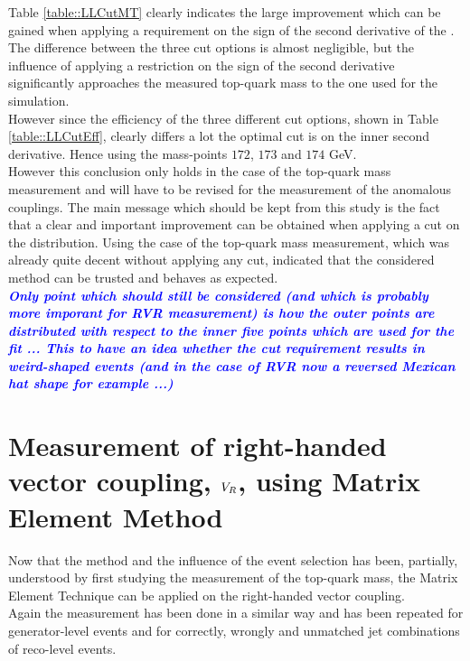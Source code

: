 Table \ref{table::LLCutMT} clearly indicates the large improvement which can be gained when applying a requirement on the sign of the second derivative of the \NegLL. 
The difference between the three cut options is almost negligible, but the influence of applying a restriction on the sign of the second derivative significantly approaches the measured top-quark mass to the one used for the simulation.\\
However since the efficiency of the three different cut options, shown in Table \ref{table::LLCutEff}, clearly differs a lot the optimal cut is on the inner second derivative. Hence using the mass-points $172$, $173$ and $174$ GeV.\\

However this conclusion only holds in the case of the top-quark mass measurement and will have to be revised for the measurement of the anomalous couplings. The main message which should be kept from this study is the fact that a clear and important improvement can be obtained when applying a cut on the \NegLL distribution. Using the case of the top-quark mass measurement, which was already quite decent without applying any cut, indicated that the considered method can be trusted and behaves as expected.\\

\textit{\textbf{\textcolor{blue}{Only point which should still be considered (and which is probably more imporant for RVR measurement) is how the outer points are distributed with respect to the inner five points which are used for the fit ... This to have an idea whether the cut requirement results in weird-shaped events (and in the case of RVR now a reversed Mexican hat shape for example ...)}}}

\section{Measurement of right-handed vector coupling, $V_{R}$, using Matrix Element Method}
Now that the method and the influence of the event selection has been, partially, understood by first studying the measurement of the top-quark mass, the Matrix Element Technique can be applied on the right-handed vector coupling.\\
Again the measurement has been done in a similar way and has been repeated for generator-level events and for correctly, wrongly and unmatched jet combinations of reco-level events.
